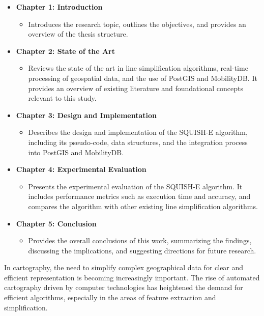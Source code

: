 \begin{itemize}
    \item \textbf{Chapter 1: Introduction}
    \begin{itemize}
        \item Introduces the research topic, outlines the objectives, and provides an overview of the thesis structure.
    \end{itemize}
    
    \item \textbf{Chapter 2: State of the Art}
    \begin{itemize}
        \item Reviews the state of the art in line simplification algorithms, real-time processing of geospatial data, and the use of PostGIS and MobilityDB. It provides an overview of existing literature and foundational concepts relevant to this study.
    \end{itemize}
    
    \item \textbf{Chapter 3: Design and Implementation}
    \begin{itemize}
        \item Describes the design and implementation of the SQUISH-E algorithm, including its pseudo-code, data structures, and the integration process into PostGIS and MobilityDB.
    \end{itemize}
    
    \item \textbf{Chapter 4: Experimental Evaluation}
    \begin{itemize}
        \item Presents the experimental evaluation of the SQUISH-E algorithm. It includes performance metrics such as execution time and accuracy, and compares the algorithm with other existing line simplification algorithms.
    \end{itemize}
    
    \item \textbf{Chapter 5: Conclusion}
    \begin{itemize}
        \item Provides the overall conclusions of this work, summarizing the findings, discussing the implications, and suggesting directions for future research.
    \end{itemize}
\end{itemize}




\iffalse
In cartography, the need to simplify complex geographical data for clear and efficient representation is becoming increasingly important. The rise of automated cartography driven by computer technologies has heightened the demand for efficient algorithms, especially in the areas of feature extraction and simplification.\\


